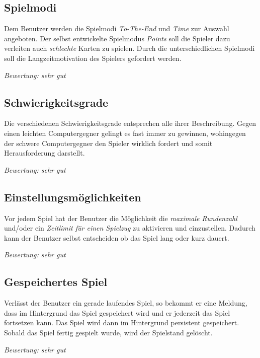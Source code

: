 \subsection{Spielmodi}
Dem Benutzer werden die Spielmodi \emph{To-The-End} und \emph{Time} zur Auswahl angeboten. Der selbst entwickelte Spielmodus \emph{Points} soll die Spieler dazu verleiten auch \emph{schlechte} Karten zu spielen. Durch die unterschiedlichen Spielmodi soll die Langzeitmotivation des Spielers gefordert werden.

\vspace{5mm}
\emph{Bewertung: sehr gut}
\vspace{5mm}

\subsection{Schwierigkeitsgrade}
Die verschiedenen Schwierigkeitsgrade entsprechen alle ihrer Beschreibung. Gegen einen leichten Computergegner gelingt es fast immer zu gewinnen, wohingegen der schwere Computergegner den Spieler wirklich fordert und somit Herausforderung darstellt.

\vspace{5mm}
\emph{Bewertung: sehr gut}
\vspace{5mm}

\subsection{Einstellungsmöglichkeiten}
Vor jedem Spiel hat der Benutzer die Möglichkeit die \emph{maximale Rundenzahl} und/oder ein \emph{Zeitlimit für einen Spielzug} zu aktivieren und einzustellen. Dadurch kann der Benutzer selbst entscheiden ob das Spiel lang oder kurz dauert.

\vspace{5mm}
\emph{Bewertung: sehr gut}
\vspace{5mm}

\subsection{Gespeichertes Spiel}
Verlässt der Benutzer ein gerade laufendes Spiel, so bekommt er eine Meldung, dass im Hintergrund das Spiel gespeichert wird und er jederzeit das Spiel fortsetzen kann. Das Spiel wird dann im Hintergrund persistent gespeichert. Sobald das Spiel fertig gespielt wurde, wird der Spielstand gelöscht.

\vspace{5mm}
\emph{Bewertung: sehr gut}
\vspace{5mm}

